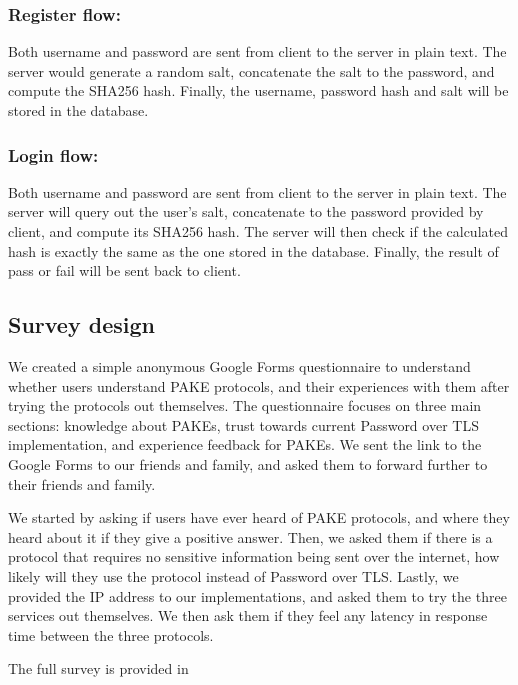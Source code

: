 \subsubsection{Register flow:}
Both username and password are sent from client to the server in plain text.
The server would generate a random salt, concatenate the salt to the password, and compute the SHA256 hash.
Finally, the username, password hash and salt will be stored in the database.

\subsubsection{Login flow:}
Both username and password are sent from client to the server in plain text.
The server will query out the user's salt, concatenate to the password provided by client, and compute its SHA256 hash.
The server will then check if the calculated hash is exactly the same as the one stored in the database.
Finally, the result of pass or fail will be sent back to client.

\subsection{Survey design}

We created a simple anonymous Google Forms questionnaire to understand whether users understand PAKE protocols, and their experiences with them after trying the protocols out themselves.
The questionnaire focuses on three main sections: knowledge about PAKEs, trust towards current Password over TLS implementation, and experience feedback for PAKEs.
We sent the link to the Google Forms to our friends and family, and asked them to forward further to their friends and family.


We started by asking if users have ever heard of PAKE protocols, and where they heard about it if they give a positive answer.
Then, we asked them if there is a protocol that requires no sensitive information being sent over the internet, how likely will they use the protocol instead of Password over TLS.
Lastly, we provided the IP address to our implementations, and asked them to try the three services out themselves.
We then ask them if they feel any latency in response time between the three protocols.

The full survey is provided in ~

